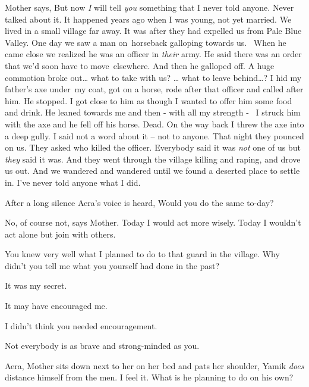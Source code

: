 \documentclass[letterpaper]{article}
\begin{document}
Mother says, {\textquotedbl}But now \textit{I }will tell \textit{you} something that I never told anyone. Never talked
about it. It happened years ago when I was young, not yet married. We lived in a small village far away. It was after
they had expelled us from Pale Blue Valley. One day we saw a man on~horseback galloping towards us. ~When he came close
we realized he was an officer in \textit{their} army. He said there was an order that we'd soon have to move~elsewhere.
And then he galloped off. A huge commotion broke out{\dots} what to take with us? {\dots} what to leave behind{\dots}?
I hid my father's axe under~my coat, got on a horse, rode after that officer and called after him. He stopped. I got
close to him as though I wanted to offer him some food and drink. He leaned towards me and then - with all my strength
- \ I struck him with the axe and he fell off his horse. Dead. On the way back I threw the axe into a deep gully. I
said not a word about it -- not to anyone. That night they pounced on us. They asked who killed the officer. Everybody
said it was \textit{not} one of us but \textit{they} said it was. And they went through the village killing and raping,
and drove us out. And we wandered and wandered until we found a deserted place to settle in. I've never told anyone
what I did.{\textquotedbl}

After a long silence Aera's voice is heard, {\textquotedbl}Would you do the same to-day?{\textquotedbl} 

{\textquotedbl}No, of course not,{\textquotedbl} says Mother. {\textquotedbl}Today I would act more wisely. Today I
wouldn't act alone but join with others.{\textquotedbl} 

{\textquotedbl}You knew very well what I planned to do to that guard in the village. Why didn't you tell me what you
yourself had done in the past?{\textquotedbl} 

{\textquotedbl}It was my secret.{\textquotedbl} 

{\textquotedbl}It may have encouraged me.{\textquotedbl} 

{\textquotedbl}I didn't think you needed encouragement.{\textquotedbl} 

{\textquotedbl}Not everybody is as brave and strong-minded as you.{\textquotedbl} 

{\textquotedbl}Aera,{\textquotedbl} Mother sits down next to her on her bed and pats her shoulder, {\textquotedbl}Yamik
\textit{does} distance himself from the men. I feel it. What is he planning to do on his own?{\textquotedbl} 
\end{document}
